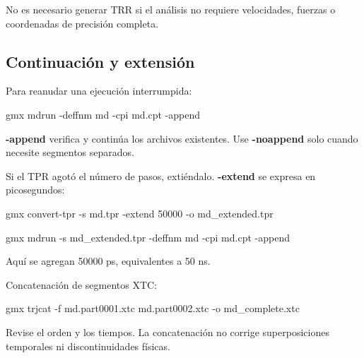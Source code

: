 \documentclass[
  spanish,
  11pt,
  a4paper]{article}
\newenvironment{Shaded}{\begin{snugshade}}{\end{snugshade}}
\newcommand{\AttributeTok}[1]{\textcolor[rgb]{0.13,0.29,0.53}{#1}}
\newcommand{\ExtensionTok}[1]{#1}
\newcommand{\NormalTok}[1]{#1}
\begin{document}
No es necesario generar TRR si el análisis no requiere velocidades,
fuerzas o coordenadas de precisión completa.

\subsection{Continuación y
extensión}\label{continuaciuxf3n-y-extensiuxf3n}

Para reanudar una ejecución interrumpida:

\begin{Shaded}
\begin{Highlighting}[]
\ExtensionTok{gmx}\NormalTok{ mdrun }\AttributeTok{{-}deffnm}\NormalTok{ md }\AttributeTok{{-}cpi}\NormalTok{ md.cpt }\AttributeTok{{-}append}
\end{Highlighting}
\end{Shaded}

\textbf{-append} verifica y continúa los archivos existentes. Use
\textbf{-noappend} solo cuando necesite segmentos separados.

Si el TPR agotó el número de pasos, extiéndalo. \textbf{-extend} se
expresa en picosegundos:

\begin{Shaded}
\begin{Highlighting}[]
\ExtensionTok{gmx}\NormalTok{ convert{-}tpr     }\AttributeTok{{-}s}\NormalTok{ md.tpr     }\AttributeTok{{-}extend}\NormalTok{ 50000     }\AttributeTok{{-}o}\NormalTok{ md\_extended.tpr}

\ExtensionTok{gmx}\NormalTok{ mdrun     }\AttributeTok{{-}s}\NormalTok{ md\_extended.tpr     }\AttributeTok{{-}deffnm}\NormalTok{ md     }\AttributeTok{{-}cpi}\NormalTok{ md.cpt     }\AttributeTok{{-}append}
\end{Highlighting}
\end{Shaded}

Aquí se agregan 50000 ps, equivalentes a 50 ns.

Concatenación de segmentos XTC:

\begin{Shaded}
\begin{Highlighting}[]
\ExtensionTok{gmx}\NormalTok{ trjcat     }\AttributeTok{{-}f}\NormalTok{ md.part0001.xtc md.part0002.xtc     }\AttributeTok{{-}o}\NormalTok{ md\_complete.xtc}
\end{Highlighting}
\end{Shaded}

Revise el orden y los tiempos. La concatenación no corrige
superposiciones temporales ni discontinuidades físicas.
\end{document}
